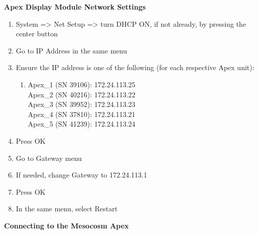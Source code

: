 \documentclass[
]{book}
\providecommand{\tightlist}{%
  \setlength{\itemsep}{0pt}\setlength{\parskip}{0pt}}
\begin{document}
\textbf{Apex Display Module Network Settings}

\begin{enumerate}
\def\labelenumi{\arabic{enumi}.}
\tightlist
\item
  System =\textgreater{} Net Setup =\textgreater{} turn DHCP ON, if not already, by pressing the center button\\
\item
  Go to IP Address in the same menu\\
\item
  Ensure the IP address is one of the following (for each respective Apex unit):

  \begin{enumerate}
  \def\labelenumii{\arabic{enumii}.}
  \tightlist
  \item
    Apex\_1 (SN 39106): 172.24.113.25\\
    Apex\_2 (SN 40216): 172.24.113.22\\
    Apex\_3 (SN 39952): 172.24.113.23\\
    Apex\_4 (SN 37810): 172.24.113.21\\
    Apex\_5 (SN 41239): 172.24.113.24\\
  \end{enumerate}
\item
  Press OK\\
\item
  Go to Gateway menu\\
\item
  If needed, change Gateway to 172.24.113.1\\
\item
  Press OK\\
\item
  In the same menu, select Restart
\end{enumerate}

\textbf{Connecting to the Mesocosm Apex}
\end{document}
